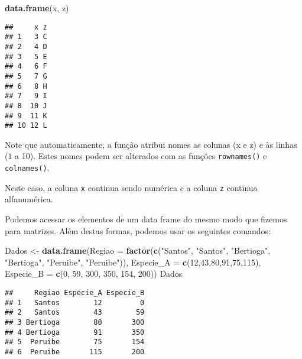 \documentclass[
]{book}
\newenvironment{Shaded}{\begin{snugshade}}{\end{snugshade}}
\newcommand{\DataTypeTok}[1]{\textcolor[rgb]{0.13,0.29,0.53}{#1}}
\newcommand{\DecValTok}[1]{\textcolor[rgb]{0.00,0.00,0.81}{#1}}
\newcommand{\KeywordTok}[1]{\textcolor[rgb]{0.13,0.29,0.53}{\textbf{#1}}}
\newcommand{\NormalTok}[1]{#1}
\newcommand{\StringTok}[1]{\textcolor[rgb]{0.31,0.60,0.02}{#1}}
\begin{document}
\begin{Shaded}
\begin{Highlighting}[]
\KeywordTok{data.frame}\NormalTok{(x, z)}
\end{Highlighting}
\end{Shaded}

\begin{verbatim}
##     x z
## 1   3 C
## 2   4 D
## 3   5 E
## 4   6 F
## 5   7 G
## 6   8 H
## 7   9 I
## 8  10 J
## 9  11 K
## 10 12 L
\end{verbatim}

Note que automaticamente, a função atribui nomes as colunas (x e z) e às linhas (\(1\) a 10). Estes nomes podem ser alterados com as funções \texttt{rownames()} e \texttt{colnames()}.

Neste caso, a coluna \texttt{x} continua sendo numérica e a coluna \texttt{z} continua alfanumérica.

Podemos acessar os elementos de um data frame do mesmo modo que fizemos para matrizes. Além destas formas, podemos usar os seguintes comandos:

\begin{Shaded}
\begin{Highlighting}[]
\NormalTok{Dados <-}\StringTok{ }\KeywordTok{data.frame}\NormalTok{(}\DataTypeTok{Regiao =} \KeywordTok{factor}\NormalTok{(}\KeywordTok{c}\NormalTok{(}\StringTok{"Santos"}\NormalTok{, }\StringTok{"Santos"}\NormalTok{, }
                                     \StringTok{"Bertioga"}\NormalTok{, }\StringTok{"Bertioga"}\NormalTok{, }
                                     \StringTok{"Peruibe"}\NormalTok{, }\StringTok{"Peruibe"}\NormalTok{)),}
                   \DataTypeTok{Especie_A =} \KeywordTok{c}\NormalTok{(}\DecValTok{12}\NormalTok{,}\DecValTok{43}\NormalTok{,}\DecValTok{80}\NormalTok{,}\DecValTok{91}\NormalTok{,}\DecValTok{75}\NormalTok{,}\DecValTok{115}\NormalTok{), }
                   \DataTypeTok{Especie_B =} \KeywordTok{c}\NormalTok{(}\DecValTok{0}\NormalTok{, }\DecValTok{59}\NormalTok{, }\DecValTok{300}\NormalTok{, }\DecValTok{350}\NormalTok{, }\DecValTok{154}\NormalTok{, }\DecValTok{200}\NormalTok{))}
\NormalTok{Dados}
\end{Highlighting}
\end{Shaded}

\begin{verbatim}
##     Regiao Especie_A Especie_B
## 1   Santos        12         0
## 2   Santos        43        59
## 3 Bertioga        80       300
## 4 Bertioga        91       350
## 5  Peruibe        75       154
## 6  Peruibe       115       200
\end{verbatim}
\end{document}
